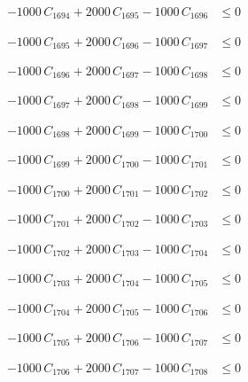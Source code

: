 \documentclass[a4paper,11pt]{article}
\begin{document}
\begin{align}
-1000\,C_{1694} + 2000\,C_{1695} - 1000\,C_{1696} &\leq 0 \nonumber
\end{align}

\begin{align}
-1000\,C_{1695} + 2000\,C_{1696} - 1000\,C_{1697} &\leq 0 \nonumber
\end{align}

\begin{align}
-1000\,C_{1696} + 2000\,C_{1697} - 1000\,C_{1698} &\leq 0 \nonumber
\end{align}

\begin{align}
-1000\,C_{1697} + 2000\,C_{1698} - 1000\,C_{1699} &\leq 0 \nonumber
\end{align}

\begin{align}
-1000\,C_{1698} + 2000\,C_{1699} - 1000\,C_{1700} &\leq 0 \nonumber
\end{align}

\begin{align}
-1000\,C_{1699} + 2000\,C_{1700} - 1000\,C_{1701} &\leq 0 \nonumber
\end{align}

\begin{align}
-1000\,C_{1700} + 2000\,C_{1701} - 1000\,C_{1702} &\leq 0 \nonumber
\end{align}

\begin{align}
-1000\,C_{1701} + 2000\,C_{1702} - 1000\,C_{1703} &\leq 0 \nonumber
\end{align}

\begin{align}
-1000\,C_{1702} + 2000\,C_{1703} - 1000\,C_{1704} &\leq 0 \nonumber
\end{align}

\begin{align}
-1000\,C_{1703} + 2000\,C_{1704} - 1000\,C_{1705} &\leq 0 \nonumber
\end{align}

\begin{align}
-1000\,C_{1704} + 2000\,C_{1705} - 1000\,C_{1706} &\leq 0 \nonumber
\end{align}

\begin{align}
-1000\,C_{1705} + 2000\,C_{1706} - 1000\,C_{1707} &\leq 0 \nonumber
\end{align}

\begin{align}
-1000\,C_{1706} + 2000\,C_{1707} - 1000\,C_{1708} &\leq 0 \nonumber
\end{align}
\end{document}
